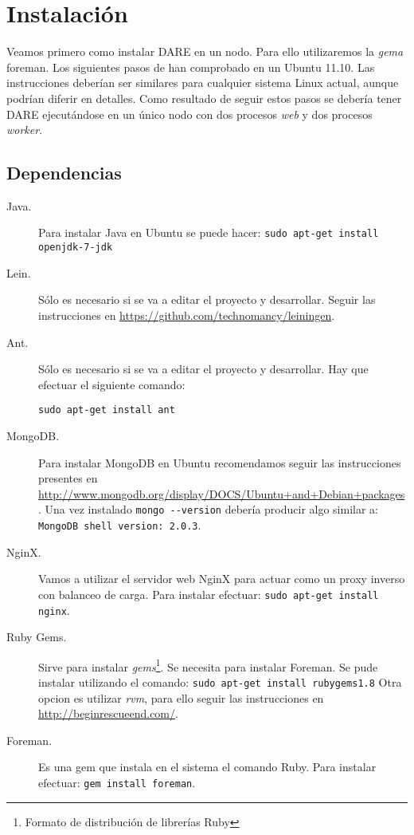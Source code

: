 \section{Instalación}
Veamos primero como instalar DARE en un nodo. Para ello
utilizaremos la \emph{gema} foreman. Los siguientes pasos de han
comprobado en un Ubuntu 11.10. Las instrucciones deberían ser
similares para cualquier sistema Linux actual, aunque podrían diferir
en detalles. Como resultado de seguir estos pasos se debería tener
DARE ejecutándose en un único nodo con dos procesos \emph{web} y dos
procesos \emph{worker}.

\subsection{Dependencias}
\begin{description}
\item[Java.] Para instalar Java en Ubuntu se puede hacer:
  \verb+sudo apt-get install openjdk-7-jdk+
\item[Lein.] Sólo es necesario si se va a editar el proyecto y
  desarrollar. Seguir las instrucciones en
  \url{https://github.com/technomancy/leiningen}.
\item[Ant.] Sólo es necesario si se va a editar el proyecto y
  desarrollar. Hay que efectuar el siguiente comando:

  \verb+sudo apt-get install ant+

\item[MongoDB.] Para instalar MongoDB en Ubuntu recomendamos seguir
  las instrucciones presentes en
  \url{http://www.mongodb.org/display/DOCS/Ubuntu+and+Debian+packages}. Una
  vez instalado \verb+mongo --version+ debería producir algo similar
  a: \verb+MongoDB shell version: 2.0.3+.
\item[NginX.] Vamos a utilizar el servidor web NginX para actuar como
  un proxy inverso con balanceo de carga. Para instalar efectuar:
  \verb+sudo apt-get install nginx+.
\item[Ruby Gems.] Sirve para instalar
  \emph{gems}\cite{RUBY_GEMS}\footnote{Formato de distribución de
    librerías Ruby}. Se necesita para instalar Foreman.  Se pude
  instalar utilizando el comando:
  \verb+sudo apt-get install rubygems1.8+ Otra opcion es utilizar
  \emph{rvm}, para ello seguir las instrucciones en
  \url{http://beginrescueend.com/}.
\item[Foreman.] Es una gem que instala en el sistema el comando
  Ruby. Para instalar efectuar: \verb+gem install foreman+.
\end{description}

